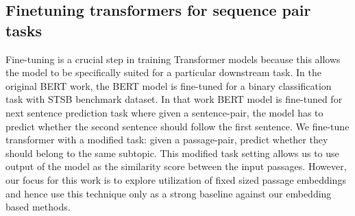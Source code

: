 \documentclass[sigconf,authordraft]{acmart}
\begin{document}
\subsection{Finetuning transformers for sequence pair tasks} Fine-tuning is a crucial step in training Transformer models because this allows the model to be specifically suited for a particular downstream task. In the original BERT work, the BERT model is fine-tuned for a binary classification task with STSB benchmark dataset. In that work BERT model is fine-tuned for next sentence prediction task where given a sentence-pair, the model has to predict whether the second sentence should follow the first sentence. We fine-tune transformer with a modified task: given a passage-pair, predict whether they should belong to the same subtopic. This modified task setting allows us to use output of the model as the similarity score between the input passages. However, our focus for this work is to explore utilization of fixed sized passage embeddings and hence use this technique only as a strong baseline against our embedding based methods.



\end{document}
